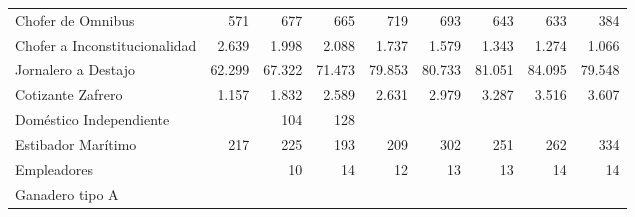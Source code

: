 \begin{tabular}{lllllllll}
\multicolumn{1}{l}{\hspace{1em}Chofer de Omnibus} &
  \multicolumn{1}{|r}{571} &
  \multicolumn{1}{r}{677} &
  \multicolumn{1}{r}{665} &
  \multicolumn{1}{r}{719} &
  \multicolumn{1}{r}{693} &
  \multicolumn{1}{r}{643} &
  \multicolumn{1}{r}{633} &
  \multicolumn{1}{r}{384} \\
\multicolumn{1}{l}{\hspace{1em}Chofer a Inconstitucionalidad} &
  \multicolumn{1}{|r}{2.639} &
  \multicolumn{1}{r}{1.998} &
  \multicolumn{1}{r}{2.088} &
  \multicolumn{1}{r}{1.737} &
  \multicolumn{1}{r}{1.579} &
  \multicolumn{1}{r}{1.343} &
  \multicolumn{1}{r}{1.274} &
  \multicolumn{1}{r}{1.066} \\
\multicolumn{1}{l}{\hspace{1em}Jornalero a Destajo} &
  \multicolumn{1}{|r}{62.299} &
  \multicolumn{1}{r}{67.322} &
  \multicolumn{1}{r}{71.473} &
  \multicolumn{1}{r}{79.853} &
  \multicolumn{1}{r}{80.733} &
  \multicolumn{1}{r}{81.051} &
  \multicolumn{1}{r}{84.095} &
  \multicolumn{1}{r}{79.548} \\
\multicolumn{1}{l}{\hspace{1em}Cotizante Zafrero} &
  \multicolumn{1}{|r}{1.157} &
  \multicolumn{1}{r}{1.832} &
  \multicolumn{1}{r}{2.589} &
  \multicolumn{1}{r}{2.631} &
  \multicolumn{1}{r}{2.979} &
  \multicolumn{1}{r}{3.287} &
  \multicolumn{1}{r}{3.516} &
  \multicolumn{1}{r}{3.607} \\
\multicolumn{1}{l}{\hspace{1em}Doméstico Independiente} &
  \multicolumn{1}{|r}{} &
  \multicolumn{1}{r}{104} &
  \multicolumn{1}{r}{128} &
  \multicolumn{1}{r}{} &
  \multicolumn{1}{r}{} &
  \multicolumn{1}{r}{} &
  \multicolumn{1}{r}{} &
  \multicolumn{1}{r}{} \\
\multicolumn{1}{l}{\hspace{1em}Estibador Marítimo} &
  \multicolumn{1}{|r}{217} &
  \multicolumn{1}{r}{225} &
  \multicolumn{1}{r}{193} &
  \multicolumn{1}{r}{209} &
  \multicolumn{1}{r}{302} &
  \multicolumn{1}{r}{251} &
  \multicolumn{1}{r}{262} &
  \multicolumn{1}{r}{334} \\
\multicolumn{1}{l}{\hspace{1em}Empleadores} &
  \multicolumn{1}{|r}{} &
  \multicolumn{1}{r}{10} &
  \multicolumn{1}{r}{14} &
  \multicolumn{1}{r}{12} &
  \multicolumn{1}{r}{13} &
  \multicolumn{1}{r}{13} &
  \multicolumn{1}{r}{14} &
  \multicolumn{1}{r}{14} \\
\multicolumn{1}{l}{\hspace{1em}Ganadero tipo A} &

\end{tabular}
